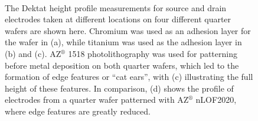 \documentclass[
  letterpaper,
  DIV=11,
  numbers=noendperiod]{scrartcl}
\begin{document}
\begin{figure}
\begin{minipage}[t]{0.47\linewidth}
{{}

}

\subcaption{\label{fig-dektat-AZ1518-electrode}}
\end{minipage}%
%
\begin{minipage}[t]{0.05\linewidth}

{\centering 

~

}

\end{minipage}%
%
\begin{minipage}[t]{0.47\linewidth}

{\centering 


}

\subcaption{\label{fig-dektat-nLOF-electrode}}
\end{minipage}%

\caption{\label{fig-electrodes-dektat}The Dektat height profile
measurements for source and drain electrodes taken at different
locations on four different quarter wafers are shown here. Chromium was
used as an adhesion layer for the wafer in (a), while titanium was used
as the adhesion layer in (b) and (c). AZ\(^\circledR\) 1518
photolithography was used for patterning before metal deposition on both
quarter wafers, which led to the formation of edge features or ``cat
ears'', with (c) illustrating the full height of these features. In
comparison, (d) shows the profile of electrodes from a quarter wafer
patterned with AZ\(^\circledR\) nLOF2020, where edge features are
greatly reduced.}

\end{figure}
\end{document}
